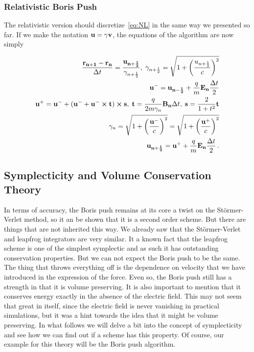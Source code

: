 \documentclass[12pt, class=report, crop=false]{standalone}
\begin{document}
\subsubsection{Relativistic Boris Push}

The relativistic version should discretize~\cref{eq:NL} in the same way we presented so far. If we make the notation \(\vb{u} = \gamma \vb{v}\), the equations of the algorithm are now simply

\begin{subequations}
  \begin{align}
    \frac{\vb{r_{n+1}} - \vb{r_n}}{\Delta t} = \frac{\vb{u_{n+\frac{1}{2}}}}{\gamma_{n+\frac{1}{2}}},\; \gamma_{n+\frac{1}{2}} =
    \sqrt{1+\left(\frac{u_{n+\frac{1}{2}}}{c}\right)^2}\\
    \vb{u^-} = \vb{u_{n-\frac{1}{2}}} + \frac{q}{m} \vb{E_n} \frac{\Delta t}{2}\\
    \vb{u^+} = \vb{u^-} + (\vb{u^-} + \vb{u^-} \cp \vb{t}) \cp \vb{s},\;
    \vb{t} = \frac{q}{2m \gamma_n} \vb{B_n} \Delta t,\; \vb{s} = \frac{2}{1+t^2} \vb{t}\\
    \gamma_n = \sqrt{1+\left(\frac{\vb{u}^-}{c}\right)^2} = \sqrt{1+\left(\frac{\vb{u}^+}{c}\right)^2}\\
    \vb{u_{n+\frac{1}{2}}} = \vb{u^+} + \frac{q}{m} \vb{E_n} \frac{\Delta t}{2}\,.
  \end{align}
\end{subequations}

\subsection{Symplecticity and Volume Conservation Theory}

In terms of accuracy, the Boris push remains at its core a twist on the Störmer-Verlet method, so it an be shown that it is a second order scheme. But there are things that are not inherited this way. We already saw that the Störmer-Verlet and leapfrog integrators are very similar. It a known fact that the leapfrog scheme is one of the simplest symplectic and as such it has outstanding conservation properties. But we can not expect the Boris push to be the same. The thing that throws everything off is the dependence on velocity that we have introduced in the expression of the force. Even so, the Boris push still has a strength in that it is volume preserving. It is also important to mention that it conserves energy exactly in the absence of the electric field. This may not seem that great in itself, since the electric field is never vanishing in practical simulations, but it was a hint towards the idea that it might be volume preserving. In what follows we will delve a bit into the concept of symplecticity and see how we can find out if a scheme has this property. Of course, our example for this theory will be the Boris push algorithm.
\end{document}
